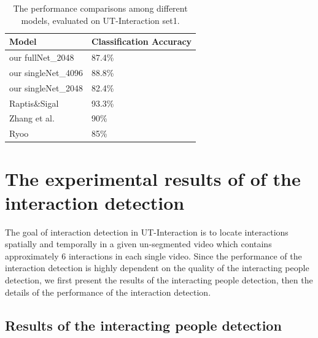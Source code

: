 \begin{table}
	\caption{The performance comparisons among different models, evaluated on UT-Interaction set1.}
	\begin{center}
		\begin{tabular}{| m{4cm} | m{4cm} |}
			\hline
			Model & Classification Accuracy \\ \hline \hline
			our fullNet\_2048 & 87.4\%   \\ \hline
			our singleNet\_4096 & 88.8\% \\ \hline
			our singleNet\_2048 & 82.4\%  \\ \hline
			Raptis\&Sigal \cite{raptis} & 93.3\%        \\ \hline
			Zhang et al. \cite{yimeng} & 90\%  \\ \hline
			Ryoo \cite{ryoo2011}  & 85\% \\ \hline
			 				
		\end{tabular}
		\label{table:threeModels}
	\end{center}
\end{table}


\section{The experimental results of of the interaction detection}
The goal of interaction detection in UT-Interaction is to locate interactions spatially and temporally in a given un-segmented video which contains approximately 6 interactions in each single video. Since the performance of the interaction detection is highly dependent on the quality of  the interacting people detection, we first present the results of the interacting people detection, then the details of the performance of the interaction detection.    

\subsection{Results of the interacting people detection} 
